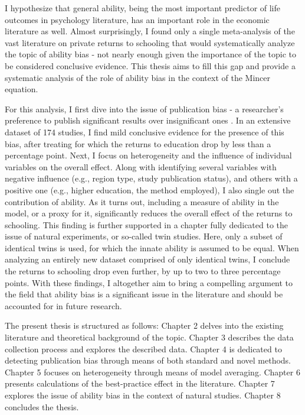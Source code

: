 I hypothesize that general ability, being the most important predictor of life outcomes in psychology literature, has an important role in the economic literature as well. Almost surprisingly, I found only a single meta-analysis of the vast literature on private returns to schooling that would systematically analyze the topic of ability bias \citep{wincenciak2022meta} - not nearly enough given the importance of the topic to be considered conclusive evidence. This thesis aims to fill this gap and provide a systematic analysis of the role of ability bias in the context of the Mincer equation.

For this analysis, I first dive into the issue of publication bias - a researcher's preference to publish significant results over insignificant ones \citep{stanley2001wheat}. In an extensive dataset of 174 studies, I find mild conclusive evidence for the presence of this bias, after treating for which the returns to education drop by less than a percentage point. Next, I focus on heterogeneity and the influence of individual variables on the overall effect. Along with identifying several variables with negative influence (e.g., region type, study publication status), and others with a positive one (e.g., higher education, the method employed), I also single out the contribution of ability. As it turns out, including a measure of ability in the model, or a proxy for it, significantly reduces the overall effect of the returns to schooling. This finding is further supported in a chapter fully dedicated to the issue of natural experiments, or so-called twin studies. Here, only a subset of identical twins is used, for which the innate ability is assumed to be equal. When analyzing an entirely new dataset comprised of only identical twins, I conclude the returns to schooling drop even further, by up to two to three percentage points. With these findings, I altogether aim to bring a compelling argument to the field that ability bias is a significant issue in the literature and should be accounted for in future research.

The present thesis is structured as follows: Chapter 2 delves into the existing literature and theoretical background of the topic. Chapter 3 describes the data collection process and explores the described data. Chapter 4 is dedicated to detecting publication bias through means of both standard and novel methods. Chapter 5 focuses on heterogeneity through means of model averaging. Chapter 6 presents calculations of the best-practice effect in the literature. Chapter 7 explores the issue of ability bias in the context of natural studies. Chapter 8 concludes the thesis.